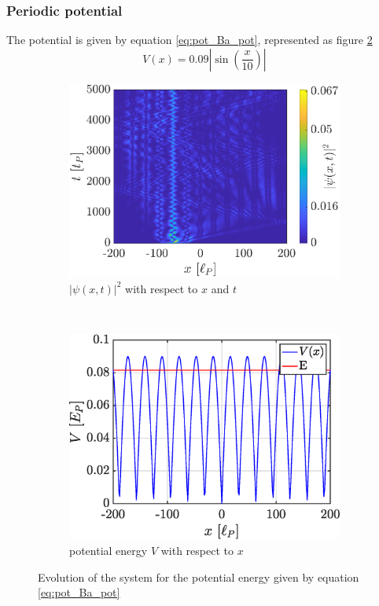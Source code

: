 \documentclass[a4paper,12pt,twoside]{article}
\newcommand{\bracket}[1]{\left(#1\right)}
\newcommand{\abs}[1]{\left|#1\right|}
\begin{document}
      \subsubsection{Periodic potential}
      The potential is given by equation \eqref{eq:pot_Ba_pot}, represented as figure \ref{fig:v_pot_Ba_pot}
        \begin{equation}
          V(x) = 0.09\abs{\sin\bracket{\frac{x}{10}}}
          \label{eq:pot_Ba_pot}
        \end{equation}

        \begin{figure}[h]
          \centering
          \begin{subfigure}[t]{0.45\textwidth}
            \includegraphics[width=\textwidth]{graphs/v_pot_Ba_evo.eps}
            \caption{$|\psi(x, t)|^2$ with respect to $x$ and $t$}
            \label{fig:v_pot_Ba_evo}
          \end{subfigure}
          ~
          \begin{subfigure}[t]{0.45\textwidth}
            \includegraphics[width=\textwidth]{graphs/v_pot_Ba_pot.eps}
            \caption{potential energy $V$ with respect to $x$}
            \label{fig:v_pot_Ba_pot}
          \end{subfigure}
          \caption{Evolution of the system for the potential energy given by equation \eqref{eq:pot_Ba_pot}}
          \label{fig:v_pot_Ba}
        \end{figure}
\end{document}
